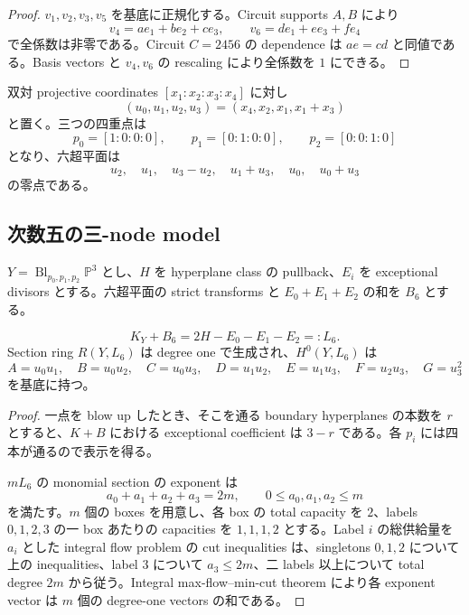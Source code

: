 \documentclass[11pt,a4paper]{ltjsarticle}
\newcommand{\PP}{\mathbb P}\newcommand{\RR}{\mathbb R}\newcommand{\CC}{\mathbb C}
\theoremstyle{plain}
\theoremstyle{definition}
\theoremstyle{remark}
\begin{document}
\begin{proof}
$v_1,v_2,v_3,v_5$ を基底に正規化する。Circuit supports $A,B$ により
\[
 v_4=ae_1+be_2+ce_3,
 \qquad
 v_6=de_1+ee_3+fe_4
\]
で全係数は非零である。Circuit $C=2456$ の dependence は $ae=cd$ と同値である。Basis vectors と $v_4,v_6$ の rescaling により全係数を $1$ にできる。
\end{proof}

双対 projective coordinates $[x_1:x_2:x_3:x_4]$ に対し
\begin{equation}\label{eq:u-coordinates}
 (u_0,u_1,u_2,u_3)=(x_4,x_2,x_1,x_1+x_3)
\end{equation}
と置く。三つの四重点は
\[
 p_0=[1:0:0:0],\qquad p_1=[0:1:0:0],\qquad p_2=[0:0:1:0]
\]
となり、六超平面は
\[
 u_2,\quad u_1,\quad u_3-u_2,\quad u_1+u_3,\quad u_0,\quad u_0+u_3
\]
の零点である。

\subsection{次数五の三-node model}
$Y=\operatorname{Bl}_{p_0,p_1,p_2}\PP^3$ とし、$H$ を hyperplane class の pullback、$E_i$ を exceptional divisors とする。六超平面の strict transforms と $E_0+E_1+E_2$ の和を $B_6$ とする。

\begin{proposition}\label{prop:L6-generation}
\[
 K_Y+B_6=2H-E_0-E_1-E_2=:L_6.
\]
Section ring $R(Y,L_6)$ は degree one で生成され、$H^0(Y,L_6)$ は
\[
 A=u_0u_1,\quad B=u_0u_2,\quad C=u_0u_3,\quad D=u_1u_2,
 \quad E=u_1u_3,\quad F=u_2u_3,\quad G=u_3^2
\]
を基底に持つ。
\end{proposition}

\begin{proof}
一点を blow up したとき、そこを通る boundary hyperplanes の本数を $r$ とすると、$K+B$ における exceptional coefficient は $3-r$ である。各 $p_i$ には四本が通るので表示を得る。

$mL_6$ の monomial section の exponent は
\[
 a_0+a_1+a_2+a_3=2m,
 \qquad 0\le a_0,a_1,a_2\le m
\]
を満たす。$m$ 個の boxes を用意し、各 box の total capacity を $2$、labels $0,1,2,3$ の一 box あたりの capacities を $1,1,1,2$ とする。Label $i$ の総供給量を $a_i$ とした integral flow problem の cut inequalities は、singletons $0,1,2$ について上の inequalities、label $3$ について $a_3\le2m$、二 labels 以上について total degree $2m$ から従う。Integral max-flow--min-cut theorem により各 exponent vector は $m$ 個の degree-one vectors の和である。
\end{proof}
\end{document}
